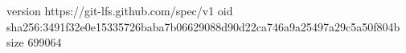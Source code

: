 version https://git-lfs.github.com/spec/v1
oid sha256:3491f32e0e15335726baba7b06629088d90d22ca746a9a25497a29c5a50f804b
size 699064
